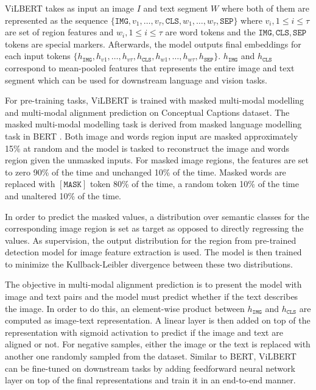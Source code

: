 \documentclass{article}
\begin{document}
ViLBERT takes as input an image $I$ and text segment $W$ where both of them are represented as the sequence $\{\mathtt{IMG}, v_{1}, \dots, v_{\tau}, \mathtt{CLS}, w_{1}, \dots, w_{\tau}, \mathtt{SEP}\}$ where $v_{i}, 1 \leq i \leq \tau$ are set of region features and $w_{i}, 1 \leq i \leq \tau$ are word tokens and the $\mathtt{IMG, CLS, SEP}$ tokens are special markers. Afterwards, the model outputs final embeddings for each input tokens $\{h_{\mathtt{IMG}}, h_{v1}, \dots, h_{v \tau}, h_{\mathtt{CLS}}, h_{w1}, \dots, h_{w \tau}, h_{\mathtt{SEP}}\}$. $h_{\mathtt{IMG}}$ and $h_{\mathtt{CLS}}$ correspond to mean-pooled features that represents the entire image and text segment which can be used for downstream language and vision tasks.

For pre-training tasks, ViLBERT is trained with masked multi-modal modelling and multi-modal alignment prediction on Conceptual Captions \citep{sharma-etal-2018-conceptual} dataset. The masked multi-modal modelling task is derived from masked language modelling task in BERT \citep{devlin-etal-2019-bert}. Both image and words region input are masked approximately 15\% at random and the model is tasked to reconstruct the image and words region given the unmasked inputs. For masked image regions, the features are set to zero 90\% of the time and unchanged 10\% of the time. Masked words are replaced with $[\mathtt{MASK}]$ token 80\% of the time, a random token 10\% of the time and unaltered 10\% of the time. 

In order to predict the masked values, a distribution over semantic classes for the corresponding image region is set as target as opposed to directly regressing the values. As supervision, the output distribution for the region from pre-trained detection model for image feature extraction is used. The model is then trained to minimize the Kullback-Leibler divergence between these two distributions.

The objective in multi-modal alignment prediction is to present the model with image and text pairs and the model must predict whether if the text describes the image. In order to do this, an element-wise product between $h_{\mathtt{IMG}}$ and $h_{\mathtt{CLS}}$ are computed as image-text representation. A linear layer is then added on top of the representation with sigmoid activation to predict if the image and text are aligned or not. For negative samples, either the image or the text is replaced with another one randomly sampled from the dataset. Similar to BERT, ViLBERT can be fine-tuned on downstream tasks by adding feedforward neural network layer on top of the final representations and train it in an end-to-end manner.
\end{document}
